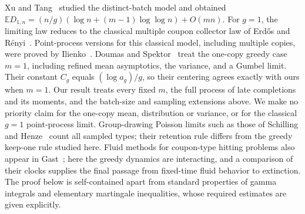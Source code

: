 \documentclass[11pt]{article}
\theoremstyle{remark}\newtheorem{remark}[theorem]{Remark}
\newcommand{\Ebb}{\mathbb E}
\begin{document}
Xu and Tang~\cite{XuTang} studied the distinct-batch model and obtained
$\Ebb D_{1,n}=(n/g)(\log n+(m-1)\log\log n)+O(mn)$.
For $g=1$, the limiting law reduces to the classical multiple coupon
collector law of Erd\H{o}s and R\'enyi~\cite{ErdosRenyi}.
Point-process versions for this classical model, including multiple copies,
were proved by Ilienko~\cite{Ilienko}.
Doumas and Spektor~\cite[Theorems 14, 20, 23]{DoumasSpektor} treat the
one-copy greedy case $m=1$, including refined mean asymptotics, the variance,
and a Gumbel limit. Their constant $C_g$ equals $(\log a_g)/g$, so their
centering agrees exactly with ours when $m=1$.
Our result treats every fixed $m$, the full process of late completions and
its moments, and the batch-size and sampling extensions above. We make no
priority claim for the one-copy mean, distribution or variance, or for the
classical $g=1$ point-process limit. Group-drawing Poisson limits such as
those of Schilling and Henze~\cite{SchillingHenze} count all sampled types;
their retention rule differs from the greedy keep-one rule studied here.
Fluid methods for coupon-type hitting problems also appear in
Gast~\cite{Gast}; here the greedy dynamics are interacting, and a comparison
of their clocks supplies the final passage from fixed-time fluid behavior
to extinction. The proof below is self-contained apart from standard
properties of gamma integrals and elementary martingale inequalities,
whose required estimates are given explicitly.
\end{document}
